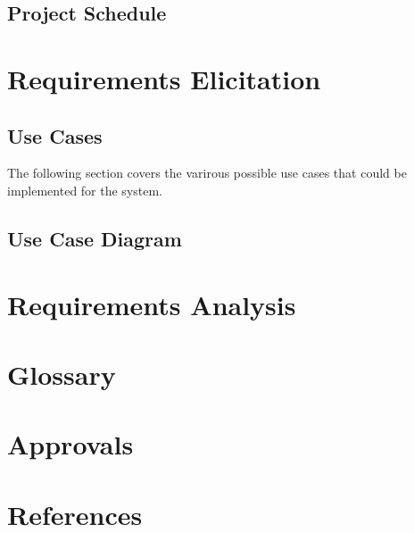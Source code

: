 \documentclass[letter,12pt]{report}
\begin{document}
\section{Project Schedule}






\chapter{Requirements Elicitation}

\section{Use Cases}
The following section covers the varirous possible use cases
that could be implemented for the system.




\section{Use Case Diagram}


\chapter{Requirements Analysis}





\chapter{Glossary}

\chapter{Approvals}

\chapter{References}
\end{document}
